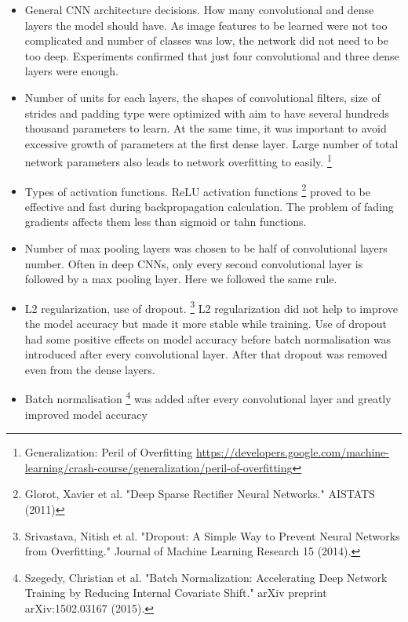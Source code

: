 \documentclass[a4paper]{article}
\begin{document}
    \begin{itemize}
        \item General CNN architecture decisions. How many convolutional and dense layers the model should have.
        As image features to be learned were not too complicated and number of classes was low, the network did
        not need to be too deep. Experiments confirmed that just four convolutional and three dense layers were enough.
        \item Number of units for each layers, the shapes of convolutional filters, size of strides and padding type
        were optimized with aim to have several hundreds thousand parameters to learn. At the same time, it was
        important to avoid excessive growth of parameters at the first dense layer.
        Large number of total network parameters also leads to network overfitting to easily.
        \footnote{Generalization: Peril of Overfitting 
            \url{https://developers.google.com/machine-learning/crash-course/generalization/peril-of-overfitting}}
        \item Types of activation functions. ReLU activation functions
        \footnote{Glorot, Xavier et al. "Deep Sparse Rectifier Neural Networks."
        AISTATS (2011)}
        proved to be effective and fast during backpropagation calculation. The problem of fading gradients
        affects them less than sigmoid or tahn functions.
        \item Number of max pooling layers was chosen to be half of convolutional layers number. Often in deep CNNs,
        only every second convolutional layer is followed by a max pooling layer. Here we followed the same rule.
        \item L2 regularization, use of dropout.
        \footnote{Srivastava, Nitish et al.
            "Dropout: A Simple Way to Prevent Neural Networks from Overfitting."
            Journal of Machine Learning Research 15 (2014).}
        L2 regularization did not help to improve the model accuracy but
        made it more stable while training. Use of dropout had some positive effects on model accuracy before
        batch normalisation was introduced after every convolutional layer. After that dropout was removed even
        from the dense layers.
        \item Batch normalisation
        \footnote{Szegedy, Christian et al.
            "Batch Normalization: Accelerating Deep Network Training by Reducing Internal Covariate Shift."
            arXiv preprint arXiv:1502.03167 ​(2015).}
        was added after every convolutional layer and greatly improved model accuracy

\end{itemize}
\end{document}
